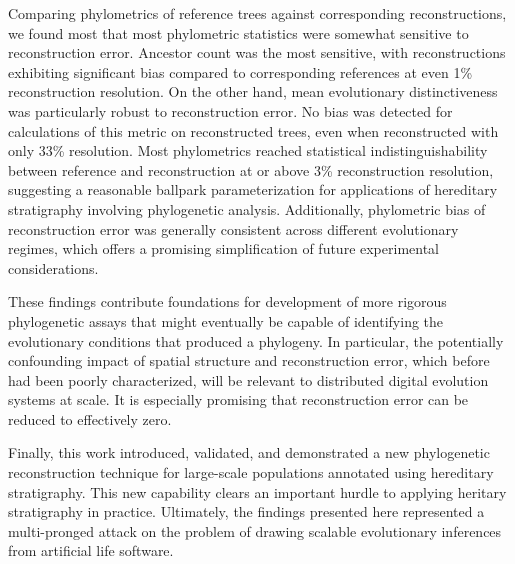 Comparing phylometrics of reference trees against corresponding reconstructions, we found most that most phylometric statistics were somewhat sensitive to reconstruction error.
Ancestor count was the most sensitive, with reconstructions exhibiting significant bias compared to corresponding references at even 1\% reconstruction resolution.
On the other hand, mean evolutionary distinctiveness was particularly robust to reconstruction error.
No bias was detected for calculations of this metric on reconstructed trees, even when reconstructed with only 33\%  resolution.
Most phylometrics reached statistical indistinguishability between reference and reconstruction at or above 3\% reconstruction resolution, suggesting a reasonable ballpark parameterization for applications of hereditary stratigraphy involving phylogenetic analysis.
Additionally, phylometric bias of reconstruction error was generally consistent across different evolutionary regimes, which offers a promising simplification of future experimental considerations.

These findings contribute foundations for development of more rigorous phylogenetic assays that might eventually be capable of identifying the evolutionary conditions that produced a phylogeny.
In particular, the potentially confounding impact of spatial structure and reconstruction error, which before had been poorly characterized, will be relevant to distributed digital evolution systems at scale. It is especially promising that reconstruction error can be reduced to effectively zero.

Finally, this work introduced, validated, and demonstrated a new phylogenetic reconstruction technique for large-scale populations annotated using hereditary stratigraphy.
This new capability clears an important hurdle to applying heritary stratigraphy in practice. Ultimately, the findings presented here represented a multi-pronged attack on the problem of drawing scalable evolutionary inferences from artificial life software.




